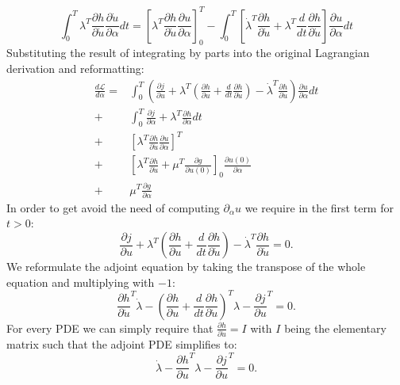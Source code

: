 \documentclass[10pt]{article}
\begin{document}
\begin{equation}
\int_{0}^{T} \lambda^T \frac{\partial h}{\partial\dot u} \frac{\partial\dot u}{\partial \alpha} dt =
\left[ \lambda^T \frac{\partial h}{\partial\dot u} \frac{\partial u}{\partial \alpha} \right]^{T}_{0} - 
\int_{0}^{T} \left[\dot \lambda^T \frac{\partial h}{\partial\dot u} + \lambda^T \frac{d}{dt}\frac{\partial h}{\partial\dot u} \right] 
\frac{\partial u}{\partial \alpha} dt
\end{equation}
Substituting the result of integrating by parts into the original Lagrangian derivation and reformatting:
\begin{align}
\frac{d\mathcal{L}}{d \alpha} = 
&\int_{0}^{T}\left( \frac{\partial j}{\partial u} + \lambda^T \left(  \frac{\partial h}{\partial u} + \frac{d}{dt}\frac{\partial h}{\partial\dot u} \right) - \dot\lambda^T \frac{\partial h}{\partial\dot u} \right) \frac{\partial u}{\partial \alpha} dt \\
+&\int_{0}^{T}\frac{\partial j}{\partial \alpha} + \lambda^T \frac{\partial h}{\partial \alpha} dt \\
+& \left[ \lambda^T \frac{\partial h}{\partial\dot u} \frac{\partial u}{\partial \alpha} \right]^{T} \\
+& \left[ \lambda^T \frac{\partial h}{\partial\dot u} + \mu^T \frac{\partial g}{\partial u(0)} \right]_{0}  \frac{\partial u(0)}{\partial \alpha} \\
+& \mu^T\frac{\partial g}{\partial\alpha}
\end{align}
In order to get avoid the need of computing $\partial_{\alpha} u$ we require in the first term for $t>0$:
\begin{equation}
\frac{\partial j}{\partial u} + \lambda^T \left(  \frac{\partial h}{\partial u} + \frac{d}{dt}\frac{\partial h}{\partial\dot u} \right) - \dot\lambda^T \frac{\partial h}{\partial\dot u} = 0.
\end{equation}
We reformulate the adjoint equation by taking the transpose of the whole equation and multiplying with $-1$:
\begin{equation}
\frac{\partial h}{\partial\dot u}^T\dot\lambda - \left(\frac{\partial h}{\partial u} + \frac{d}{dt}\frac{\partial h}{\partial\dot u} \right)^T \lambda  - \frac{\partial j}{\partial u}^T  = 0.
\end{equation}
For every PDE we can simply require that $\frac{\partial h}{\partial\dot u} = I$ with $I$ being the elementary matrix such that the adjoint PDE simplifies to:
\begin{equation}
\dot\lambda - \frac{\partial h}{\partial u}^T \lambda  - \frac{\partial j}{\partial u}^T  = 0.
\end{equation}
\end{document}
